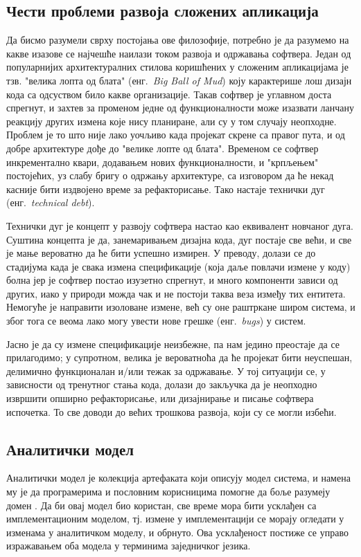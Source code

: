 \documentclass[12pt,oneside]{memoir}
\begin{document}
\subsection{Чести проблеми развоја сложених апликација}
Да бисмо разумели сврху постојања ове филозофије, потребно је да разумемо на какве изазове се најчешће наилази током развоја и одржавања софтвера. Један од популарнијих архитектуралних стилова коришћених у сложеним апликацијама је тзв. "велика лопта од блата" (енг.~\textit{Big Ball of Mud}) коју карактерише лош дизајн кода са одсуством било какве организације. Такав софтвер је углавном доста спрегнут, и захтев за променом једне од функционалности може изазвати ланчану реакцију других измена које нису планиране, али су у том случају неопходне. Проблем је то што није лако уочљиво када пројекат скрене са правог пута, и од добре архитектуре дође до "велике лопте од блата". Временом се софтвер инкрементално квари, додавањем нових функционалности, и "крпљењем" постојећих, уз слабу бригу о одржању архитектуре, са изговором да ће некад касније бити издвојено време за рефакторисање. Тако настаје технички дуг (енг.~\textit{technical debt}).

Технички дуг је концепт у развоју софтвера настао као еквивалент новчаног дуга. Суштина концепта је да, занемаривањем дизајна кода, дуг постаје све већи, и све је мање вероватно да ће бити успешно измирен. У преводу, долази се до стадијума када је свака измена спецификације (која даље повлачи измене у коду) болна јер је софтвер постао изузетно спрегнут, и много компоненти зависи од других, иако у природи можда чак и не постоји таква веза између тих ентитета. Немогуће је направити изоловане измене, већ су оне раштркане широм система, и због тога се веома лако могу увести нове грешке (енг.~\textit{bugs}) у систем.

Јасно је да су измене спецификације неизбежне, па нам једино преостаје да се прилагодимо; у супротном, велика је вероватноћа да ће пројекат бити неуспешан, делимично функционалан и/или тежак за одржавање. У тој ситуацији се, у зависности од тренутног стања кода, долази до закључка да је неопходно извршити опширно рефакторисање, или дизајнирање и писање софтвера испочетка. То све доводи до већих трошкова развоја, који су се могли избећи.

\subsection{Аналитички модел}
Аналитички модел је колекција артефаката који описују модел система, и намена му је да програмерима и пословним корисницима помогне да боље разумеју домен \cite{DomainDrivenDessign}. Да би овај модел био користан, све време мора бити усклађен са имплементационим моделом, тј. измене у имплементацији се морају огледати у изменама у аналитичком моделу, и обрнуто. Ова усклађеност постиже се управо изражавањем оба модела у терминима заједничког језика.
\end{document}
